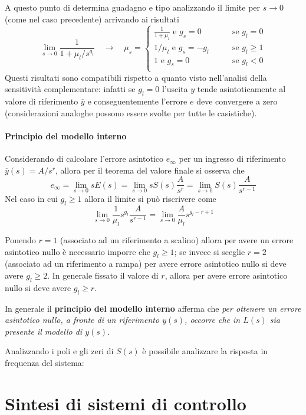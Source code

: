 		A questo punto di determina guadagno e tipo analizzando il limite per $s\rightarrow 0$ (come nel caso precedente) arrivando ai risultati
		\[ \lim_{s\rightarrow 0} \frac{1}{ 1 + \mu_l / s^{g_l}} \quad \rightarrow \quad \mu_s = \begin{cases}
			\frac{1}{1 + \mu_l} \textrm{ e } g_s = 0 \qquad & \textrm{se } g_l = 0 \\
			 1/\mu_l \textrm{ e } g_s = - g_l \qquad & \textrm{se } g_l \geq 1 \\ 
			 1 \textrm{ e } g_s = 0  \qquad & \textrm{se } g_l < 0 \\ 
		\end{cases}  \]
		Questi risultati sono compatibili rispetto a quanto visto nell'analisi della sensitività complementare: infatti se $g_l = 0$ l'uscita $y$ tende asintoticamente al valore di riferimento $\overline y$ e conseguentemente l'errore $e$ deve convergere a zero (considerazioni analoghe possono essere svolte per tutte le casistiche).
		
		\paragraph{Principio del modello interno} Considerando di calcolare l'errore asintotico $e_\infty$ per un ingresso di riferimento $\overline y(s) = A / s^r$, allora per il teorema del valore finale si osserva che
		\[ e_\infty = \lim_{s\rightarrow 0} sE(s) = \lim_{s\rightarrow 0} s S(s) \frac A{s^r}  = \lim_{s\rightarrow 0} S(s) \frac A{s^{r-1}} \]
		Nel caso in cui $g_l \geq 1$ allora il limite si può riscrivere come
		\[ \lim_{s\rightarrow 0} \frac 1  {\mu_l} s^{g_l} \frac A {s^{r-1}} = \lim_{s\rightarrow 0} \frac A {\mu_l} s^{g_l - r + 1} \]
		
		Ponendo $r=1$ (associato ad un riferimento a scalino) allora per avere un errore asintotico nullo è necessario imporre che $g_l \geq 1$; se invece si sceglie $r=2$ (associato ad un riferimento a rampa) per avere errore asintotico nullo si deve avere $g_l \geq 2$. In generale fissato il valore di $r$, allora per avere errore asintotico nullo si deve avere $g_l \geq r$.
		
		In generale il \textbf{principio del modello interno} afferma che \textit{per ottenere un errore asintotico nullo, a fronte di un riferimento $y(s)$, occorre che in $L(s)$ sia presente il modello di $y(s)$.}
		
		Analizzando i poli e gli zeri di $S(s)$ è possibile analizzare la risposta in frequenza del sistema:
		
		
		
		
\section{Sintesi di sistemi di controllo}



































